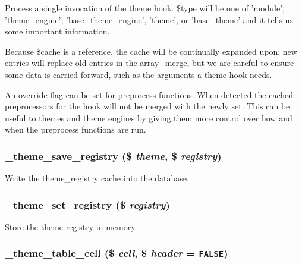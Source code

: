 Process a single invocation of the theme hook. \$type will be one of 'module', 'theme\_\-engine', 'base\_\-theme\_\-engine', 'theme', or 'base\_\-theme' and it tells us some important information.

Because \$cache is a reference, the cache will be continually expanded upon; new entries will replace old entries in the array\_\-merge, but we are careful to ensure some data is carried forward, such as the arguments a theme hook needs.

An override flag can be set for preprocess functions. When detected the cached preprocessors for the hook will not be merged with the newly set. This can be useful to themes and theme engines by giving them more control over how and when the preprocess functions are run. \hypertarget{includes_2theme_8inc_a74b1ecea2de39ca0413a1a661167d39}{
\subsubsection[{\_\-theme\_\-save\_\-registry}]{\setlength{\rightskip}{0pt plus 5cm}\_\-theme\_\-save\_\-registry (\$ {\em theme}, \/  \$ {\em registry})}}
\label{includes_2theme_8inc_a74b1ecea2de39ca0413a1a661167d39}


Write the theme\_\-registry cache into the database. \hypertarget{includes_2theme_8inc_5e6d3b110d90576d51bb23e1c080a1c1}{
\subsubsection[{\_\-theme\_\-set\_\-registry}]{\setlength{\rightskip}{0pt plus 5cm}\_\-theme\_\-set\_\-registry (\$ {\em registry})}}
\label{includes_2theme_8inc_5e6d3b110d90576d51bb23e1c080a1c1}


Store the theme registry in memory. \hypertarget{includes_2theme_8inc_df2a29e2c6631b7c0ecd833cafda9b40}{
\subsubsection[{\_\-theme\_\-table\_\-cell}]{\setlength{\rightskip}{0pt plus 5cm}\_\-theme\_\-table\_\-cell (\$ {\em cell}, \/  \$ {\em header} = {\tt FALSE})}}
\label{includes_2theme_8inc_df2a29e2c6631b7c0ecd833cafda9b40}


